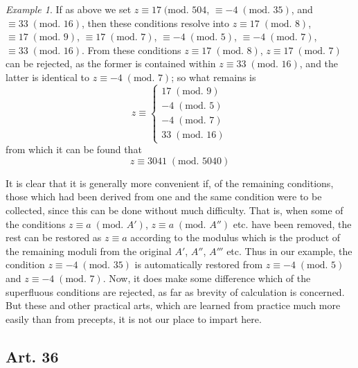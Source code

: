 \documentclass{book}
\theoremstyle{plain}
\theoremstyle{remark}
\newtheorem*{example}{Example}
\begin{document}
\begin{example} If as above we set $z \equiv 17\;(\textrm{mod. }504$, $ \equiv -4 \;(\textrm{mod. }35)$, and $\equiv 33 \;(\textrm{mod. }16)$, then these conditions resolve into $z \equiv 17 \;(\textrm{mod. }8)$, $\equiv 17 \;(\textrm{mod. } 9)$, $\equiv 17 \;(\textrm{mod. }7)$, $\equiv -4 \;(\textrm{mod. }5)$, $\equiv -4 \;(\textrm{mod. }7)$, $\equiv 33 \;(\textrm{mod. }16)$.  From these conditions $z \equiv 17 \;(\textrm{mod. }8)$, $z\equiv 17 \;(\textrm{mod. }7)$ can be rejected, as the former is contained within $z \equiv 33 \;(\textrm{mod. }16)$, and the latter is identical to $z \equiv -4 \;(\textrm{mod. }7)$; so what remains is
\[ z \equiv \left\{ \begin{array}{r} 17 \;(\textrm{mod. }9) \\ -4 \;(\textrm{mod. }5) \\ -4 \;(\textrm{mod. }7) \\ 33 \;(\textrm{mod. }16) \end{array} \right.\]
from which it can be found that
\[ z \equiv 3041 \;(\textrm{mod. }5040) \]
\end{example}

It is clear that it is generally more convenient if, of the remaining conditions, those which had been derived from one and the same condition were to be collected, since this can be done without much difficulty.  That is, when some of the conditions $z \equiv a \;(\textrm{mod. }A')$, $z \equiv a \;(\textrm{mod. }A'')$ etc. have been removed, the rest can be restored as $ z \equiv a$ according to the modulus which is the product of the remaining moduli from the original $A'$, $A''$, $A'''$ etc.   Thus in our example, the condition $z \equiv -4 \;(\textrm{mod. }35)$ is automatically restored from  $z \equiv -4 \;(\textrm{mod. }5)$ and  $z \equiv -4 \;(\textrm{mod. }7)$.  Now, it does make some difference which of the superfluous conditions are rejected, as far as brevity of calculation is concerned.  But these and other practical arts, which are learned from practice much more easily than from precepts, it is not our place to impart here.

\subsection*{Art. 36}
\end{document}
